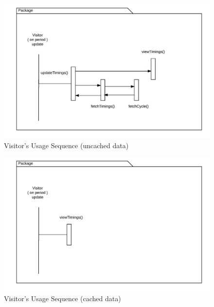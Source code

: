 \documentclass[12pt,a4paper,final]{report}
\begin{document}
	\begin{figure}[!h]
		\begin{center}
			\includegraphics[scale=0.6]{Diagrams/User_Uncached_Sequence.jpeg}
		\end{center}
		\caption{Visitor's Usage Sequence (uncached data)}
	\end{figure}
	\begin{figure}[!h]
		\begin{center}
			\includegraphics[scale=0.6]{Diagrams/User_Cached_Sequence.jpeg}
		\end{center}
		\caption{Visitor's Usage Sequence (cached data)}
	\end{figure}
\newpage
\end{document}
